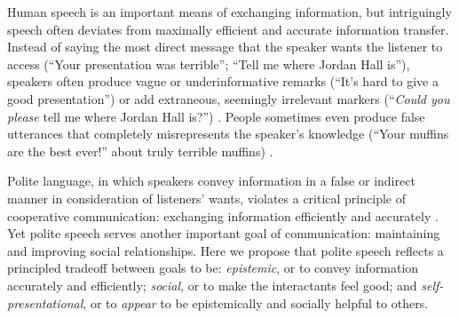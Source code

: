\documentclass[12pt]{article}
\begin{document}

Human speech is an important means of exchanging information, but
intriguingly speech often deviates from maximally efficient and accurate
information transfer. Instead of saying the most direct message that the
speaker wants the listener to access (\enquote{Your presentation was terrible}; 
\enquote{Tell me where Jordan Hall is}), speakers often produce
vague or underinformative remarks (\enquote{It's hard to give a good presentation}) 
or add extraneous, seemingly irrelevant markers
(\enquote{\emph{Could you please} tell me where Jordan Hall is?}) \cite{clark1980, holtgraves1998}. 
People sometimes even produce false utterances that completely misrepresents the
speaker's knowledge (\enquote{Your muffins are the best ever!} about truly
terrible muffins) \cite{depaulo1996}.

Polite language, in which speakers convey information in a false or indirect manner in consideration of listeners' wants, 
violates a critical principle of cooperative communication: 
exchanging information efficiently and accurately \cite{grice1975}. 
Yet polite speech serves another important goal of communication: 
maintaining and improving social relationships. 
Here we propose that polite speech reflects a principled tradeoff between goals to be: 
\emph{epistemic}, or to convey information accurately and efficiently; 
\emph{social}, or to make the interactants feel good; 
and \emph{self-presentational}, or to \emph{appear} to be epistemically and socially helpful to others.
\end{document}
